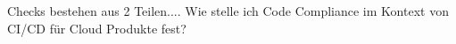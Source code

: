 \documentclass[../main.tex]{subfiles}
\begin{document}
Checks bestehen aus 2 Teilen....
Wie stelle ich Code Compliance im Kontext von CI/CD für Cloud Produkte fest?
\end{document}
